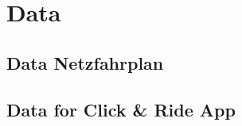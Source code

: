 \section{Data}
\label{chap:data}

\subsection{Data Netzfahrplan}
\label{chap:dataFinVe}

\subsection{Data for Click \& Ride App}
\label{chap:dataCnR}